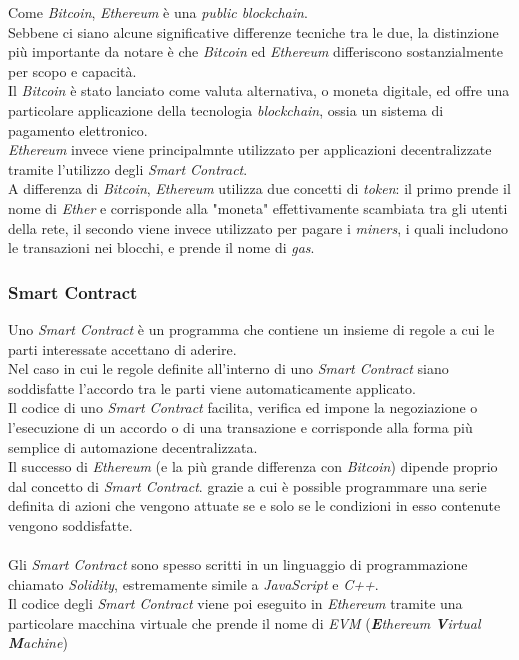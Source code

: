 \documentclass[11pt]{thesistemp}
\begin{document}
Come \textit{Bitcoin}, \textit{Ethereum} è una \textit{public blockchain}.\\
Sebbene ci siano alcune significative differenze tecniche tra le due, la distinzione più importante da notare è che \textit{Bitcoin} ed \textit{Ethereum} differiscono sostanzialmente per scopo e capacità.\\
Il \textit{Bitcoin} è stato lanciato come valuta alternativa, o moneta digitale, ed offre una particolare applicazione della tecnologia \textit{blockchain}, ossia un sistema di pagamento elettronico.\\
\textit{Ethereum} invece viene principalmnte utilizzato per applicazioni decentralizzate tramite l'utilizzo degli \textit{Smart Contract}.\\
A differenza di \textit{Bitcoin}, \textit{Ethereum} utilizza due concetti di \textit{token}: il primo prende il nome di \textit{Ether} e corrisponde alla "moneta" effettivamente scambiata tra gli utenti della rete, il secondo viene invece utilizzato per pagare i \textit{miners}, i quali includono le transazioni nei blocchi, e prende il nome di \textit{gas}.

\subsubsection{Smart Contract}

Uno \textit{Smart Contract} è un programma che contiene un insieme di regole a cui le parti interessate accettano di aderire.\\
Nel caso in cui le regole definite all'interno di uno \textit{Smart Contract} siano soddisfatte l'accordo tra le parti viene automaticamente applicato.\\
Il codice di uno \textit{Smart Contract} facilita, verifica ed impone la negoziazione o l'esecuzione di un accordo o di una transazione e corrisponde alla forma più semplice di automazione decentralizzata.\\
Il successo di \textit{Ethereum} (e la più grande differenza con \textit{Bitcoin}) dipende proprio dal concetto di \textit{Smart Contract}. grazie a cui è possible programmare una serie definita di azioni che vengono attuate se e solo se le condizioni in esso contenute vengono soddisfatte.\\\\
Gli \textit{Smart Contract} sono spesso scritti in un linguaggio di programmazione chiamato \textit{Solidity}, estremamente simile a \textit{JavaScript} e \textit{C++}.\\
Il codice degli \textit{Smart Contract} viene poi eseguito in \textit{Ethereum} tramite una particolare macchina virtuale che prende il nome di \textit{EVM} (\textit{\textbf{E}thereum \textbf{V}irtual \textbf{M}achine})
\pagebreak
\end{document}
